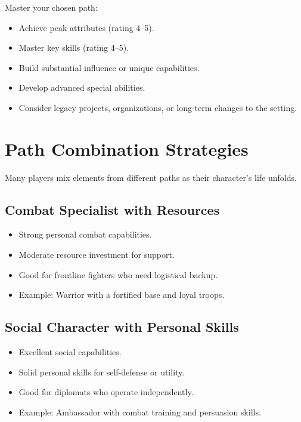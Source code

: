 Master your chosen path:
\begin{itemize}
\item Achieve peak attributes (rating 4--5).
\item Master key skills (rating 4--5).
\item Build substantial influence or unique capabilities.
\item Develop advanced special abilities.
\item Consider legacy projects, organizations, or long-term changes to the setting.
\end{itemize}


\section{Path Combination Strategies}
\label{sec:xp-combinations}

Many players mix elements from different paths as their character's life
unfolds.

\subsection*{Combat Specialist with Resources}
\begin{itemize}
\item Strong personal combat capabilities.
\item Moderate resource investment for support.
\item Good for frontline fighters who need logistical backup.
\item Example: Warrior with a fortified base and loyal troops.
\end{itemize}

\subsection*{Social Character with Personal Skills}
\begin{itemize}
\item Excellent social capabilities.
\item Solid personal skills for self-defense or utility.
\item Good for diplomats who operate independently.
\item Example: Ambassador with combat training and persuasion skills.
\end{itemize}

